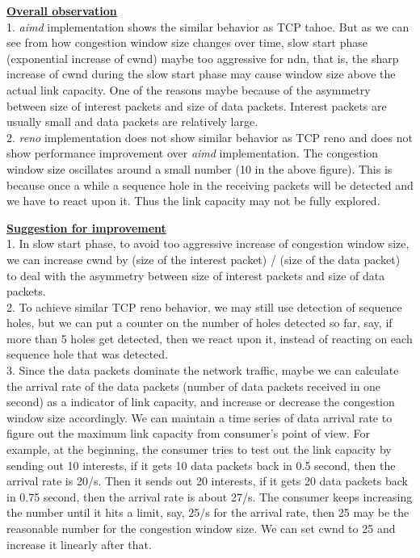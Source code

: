 \documentclass[10pt]{article}
\begin{document}
\underline{\textbf{Overall observation}}\\

1. \emph{aimd} implementation shows the similar behavior as TCP
tahoe. But as we can see from how congestion window size changes over
time, slow start phase (exponential increase of cwnd) maybe too
aggressive for ndn, that is, the sharp increase of cwnd during the
slow start phase may cause window size above the actual link
capacity. One of the reasons maybe because of the asymmetry
between size of interest packets and size of data packets. Interest
packets are usually small and data packets are relatively large.\\

2. \emph{reno} implementation does not show similar behavior as TCP
reno and does not show performance improvement over \emph{aimd}
implementation. The congestion window size oscillates around a small
number (10 in the above figure). This is because once a while a
sequence hole in the receiving packets will be detected and we have to
react upon it. Thus the link capacity may not be fully explored.

\vspace{1em}
\underline{\textbf{Suggestion for improvement}}\\

1. In slow start phase, to avoid too aggressive increase of congestion
window size, we can increase cwnd by (size of the interest packet) /
(size of the data packet) to deal with the asymmetry
between size of interest packets and size of data packets.\\

2. To achieve similar TCP reno behavior, we may still use detection of
sequence holes, but we can put a counter on the number of holes
detected so far, say, if more than 5 holes get detected, then we react
upon it, instead of reacting on each sequence hole that was detected.\\

3. Since the data packets dominate the network traffic, maybe we can
calculate the arrival rate of the data packets (number of data packets
received in one second) as a indicator of link capacity, and increase or
decrease the congestion window size accordingly. We can maintain a
time series of data arrival rate to figure out the maximum link
capacity from consumer's point of view. For example, at the beginning,
the consumer tries to test out the link capacity by sending out 10
interests, if it gets 10 data packets back in 0.5 second, then the
arrival rate is 20/s. Then it sends out 20 interests, if it gets 20
data packets back in 0.75 second, then the arrival rate is about
27/s. The consumer keeps increasing the number until it hits a limit,
say, 25/s for the arrival rate, then 25 may be the reasonable number
for the congestion window size. We can set cwnd to 25 and increase it
linearly after that.
\end{document}
